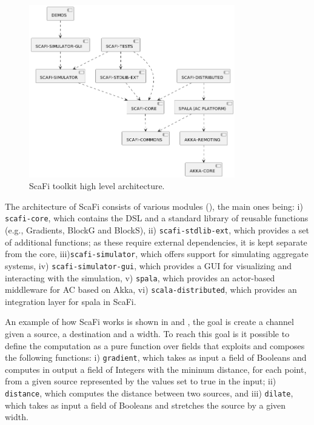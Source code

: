 \documentclass[12pt,a4paper,openright,twoside]{book}
\begin{document}
\begin{figure}[t]
    \centering
    \includegraphics[width=0.8\textwidth]{figures/scafi-arc.png}
    \caption{ScaFi toolkit high level architecture.}
    \label{fig:scafi-arc}
\end{figure}

The architecture of ScaFi consists of various modules (), the main ones being:
    i) \texttt{scafi-core}, which contains the DSL and a standard library of reusable functions 
        (e.g., Gradients, BlockG and BlockS),
    ii) \texttt{scafi-stdlib-ext}, which provides a set of additional functions; as these require external dependencies, 
        it is kept separate from the core,
    iii)\texttt{scafi-simulator}, which offers support for simulating aggregate systems,
    iv) \texttt{scafi-simulator-gui}, which provides a GUI for visualizing and interacting with the simulation,
    v) \texttt{spala}, which provides an actor-based middleware for AC based on Akka,
    vi) \texttt{scala-distributed}, which provides an integration layer for spala in ScaFi.

An example of how ScaFi works is shown in  and , the goal is create a channel given 
    a source, a destination and a width. To reach this goal is it possible to define the computation as a pure function 
    over fields that exploits and composes the following functions:
    i) \texttt{gradient}, which takes as input a field of Booleans and computes in output a field of Integers with the 
        mininum distance, for each point, from a given source represented by the values set to true in the input;
    ii) \texttt{distance}, which computes the distance between two sources, and
    iii) \texttt{dilate}, which takes as input a field of Booleans and stretches the source by a given width.
\end{document}
